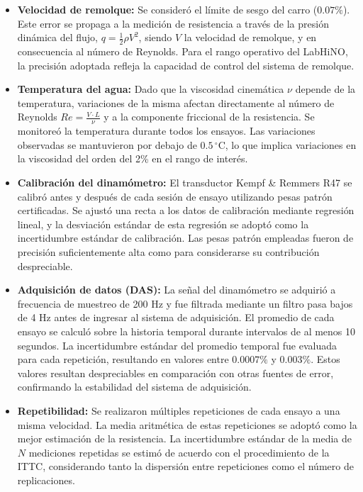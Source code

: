\begin{itemize}
        \item \textbf{Velocidad de remolque:} Se consideró el límite de sesgo del carro ($0.07\%$). Este error se propaga a la medición de resistencia a través de la presión dinámica del flujo, $q = \tfrac{1}{2}\rho V^2$, siendo $V$ la velocidad de remolque, y en consecuencia al número de Reynolds. Para el rango operativo del LabHiNO, la precisión adoptada refleja la capacidad de control del sistema de remolque.

    \item \textbf{Temperatura del agua:} Dado que la viscosidad cinemática $\nu$ depende de la temperatura, variaciones de la misma afectan directamente al número de Reynolds $Re = \tfrac{V \cdot L}{\nu}$ y a la componente friccional de la resistencia. Se monitoreó la temperatura durante todos los ensayos. Las variaciones observadas se mantuvieron por debajo de $0.5\,^\circ$C, lo que implica variaciones en la viscosidad del orden del 2\% en el rango de interés.

    \item \textbf{Calibración del dinamómetro:} El transductor Kempf \& Remmers R47 se calibró antes y después de cada sesión de ensayo utilizando pesas patrón certificadas. Se ajustó una recta a los datos de calibración mediante regresión lineal, y la desviación estándar de esta regresión se adoptó como la incertidumbre estándar de calibración. Las pesas patrón empleadas fueron de precisión suficientemente alta como para considerarse su contribución despreciable.

    \item \textbf{Adquisición de datos (DAS):} La señal del dinamómetro se adquirió a frecuencia de muestreo de 200 Hz y fue filtrada mediante un filtro pasa bajos de 4 Hz antes de ingresar al sistema de adquisición. El promedio de cada ensayo se calculó sobre la historia temporal durante intervalos de al menos 10 segundos. La incertidumbre estándar del promedio temporal fue evaluada para cada repetición, resultando en valores entre $0.0007\%$ y $0.003\%$. Estos valores resultan despreciables en comparación con otras fuentes de error, confirmando la estabilidad del sistema de adquisición.

    \item \textbf{Repetibilidad:} Se realizaron múltiples repeticiones de cada ensayo a una misma velocidad. La media aritmética de estas repeticiones se adoptó como la mejor estimación de la resistencia. La incertidumbre estándar de la media de $N$ mediciones repetidas se estimó de acuerdo con el procedimiento de la ITTC, considerando tanto la dispersión entre repeticiones como el número de replicaciones.
\end{itemize}

